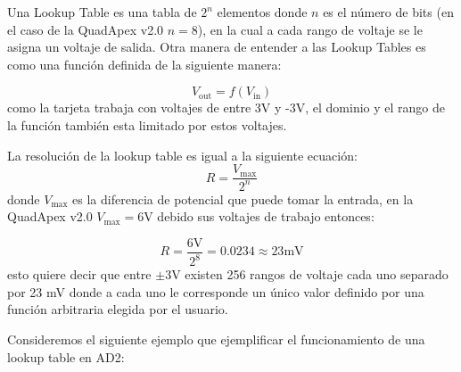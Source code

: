 		Una Lookup Table es una tabla de $2^{n}$ elementos donde $n$ es el número de bits (en el caso de la QuadApex v2.0 $n = 8$), en la cual a cada rango de voltaje se le asigna un voltaje de salida. Otra manera de entender a las Lookup Tables es como una función definida de la siguiente manera:
	
	\begin{equation}
		V_{\textrm{out}} = f \left( V_{\textrm{in}} \right)
	\end{equation}
	como la tarjeta trabaja con voltajes de entre 3V y -3V, el dominio y el rango de la función también esta limitado por estos voltajes.
	
	La resolución de la lookup table es igual a la siguiente ecuación:
		\begin{equation}
			R = \frac{V_{\textrm{max}}}{2^{n} }
		\end{equation}
	donde $V_{\textrm{max}}$ es la diferencia de potencial que puede tomar la entrada, en la QuadApex v2.0 $V_{\textrm{max}} = 6$V debido sus voltajes de trabajo entonces:
	
	\begin{equation}
		R = \frac{6\textrm{V}}{2^{8}} = 0.0234 \approx 23 \textrm{mV}
	\end{equation}
	esto quiere decir que entre $\pm$3V existen 256 rangos de voltaje cada uno separado por 23 mV donde a cada uno le corresponde un único valor definido por una función arbitraria elegida por el usuario.

	Consideremos el siguiente ejemplo que ejemplificar el funcionamiento de una lookup table en AD2:
		

